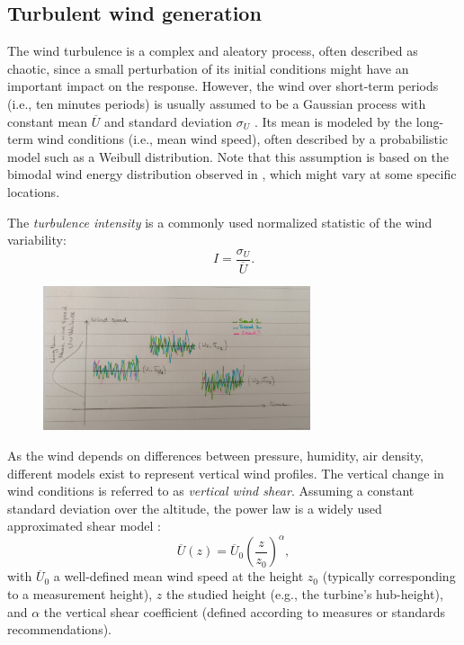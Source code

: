\noindent
{}



\subsection{Turbulent wind generation}

The wind turbulence is a complex and aleatory process, often described as chaotic, since a small perturbation of its initial conditions might have an important impact on the response. 
However, the wind over short-term periods (i.e., ten minutes periods) is usually assumed to be a Gaussian process with constant mean $\overline{U}$ and standard deviation $\sigma_U$ \citep{burton_2021_wind_handbook}. 
Its mean is modeled by the long-term wind conditions (i.e., mean wind speed), often described by a probabilistic model such as a Weibull distribution. 
Note that this assumption is based on the bimodal wind energy distribution observed in , which might vary at some specific locations. 

The \textit{turbulence intensity} is a commonly used normalized statistic of the wind variability: 
\begin{equation}
    I = \frac{\sigma_U}{\overline{U}}.
\end{equation}

\begin{figure}
    \centering
    \includegraphics[width=0.7\textwidth]{./part1/figures/wind_long_short_term.jpg}
    \label{fig:wind_long_short_term}
    \caption{}
\end{figure}

As the wind depends on differences between pressure, humidity, air density, different models exist to represent vertical wind profiles. 
The vertical change in wind conditions is referred to as \textit{vertical wind shear}.
Assuming a constant standard deviation over the altitude, the power law is a widely used approximated shear model \citep{iec_2019}:
\begin{equation}
    \overline{U}(z) = \overline{U}_0 \left(\frac{z}{z_{\mathrm{0}}}\right)^\alpha,
\end{equation}
with $\overline{U}_0$ a well-defined mean wind speed at the height $z_{\mathrm{0}}$ (typically corresponding to a measurement height), 
$z$ the studied height (e.g., the turbine's hub-height), and $\alpha$ the vertical shear coefficient (defined according to measures or standards recommendations). 

